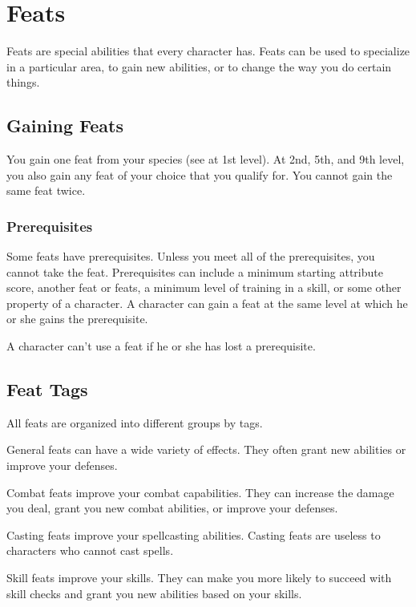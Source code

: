 \chapter{Feats}\label{Feats}

Feats are special abilities that every character has.
Feats can be used to specialize in a particular area, to gain new abilities, or to change the way you do certain things.

\section{Gaining Feats}
    You gain one feat from your species (see  at 1st level).
    At 2nd, 5th, and 9th level, you also gain any feat of your choice that you qualify for.
    You cannot gain the same feat twice.

    \subsection{Prerequisites}
        Some feats have prerequisites.
        Unless you meet all of the prerequisites, you cannot take the feat.
        Prerequisites can include a minimum starting attribute score, another feat or feats, a minimum level of training in a skill, or some other property of a character.
        A character can gain a feat at the same level at which he or she gains the prerequisite.

        A character can't use a feat if he or she has lost a prerequisite.

\section{Feat Tags}
    All feats are organized into different groups by tags.

     General feats can have a wide variety of effects.
    They often grant new abilities or improve your defenses.

     Combat feats improve your combat capabilities.
    They can increase the damage you deal, grant you new combat abilities, or improve your defenses.

     Casting feats improve your spellcasting abilities.
    Casting feats are useless to characters who cannot cast spells.

     Skill feats improve your skills.
    They can make you more likely to succeed with skill checks and grant you new abilities based on your skills.

